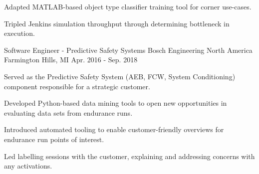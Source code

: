 \begin{cventries}
{\begin{cvitems}
          \item {Adapted MATLAB-based object type classifier training tool for corner use-cases.}
          \item {Tripled Jenkins simulation throughput through determining bottleneck in execution.}
        \fi
      \end{cvitems}
    }

  \cventry
    {Software Engineer - Predictive Safety Systems} %
    {Bosch Engineering North America} %
    {Farmington Hills, MI} %
    {Apr. 2016 - Sep. 2018} %
    {
      \begin{cvitems} %
        \item {Served as the Predictive Safety System (AEB, FCW, System Conditioning) component responsible for a strategic customer.}
        \item {Developed Python-based data mining tools to open new opportunities in evaluating data sets from endurance runs.}
        \item {Introduced automated tooling to enable customer-friendly overviews for endurance run points of interest.}
        \item {Led labelling sessions with the customer, explaining and addressing concerns with any activations.}
      \end{cvitems}
    }


\end{cventries}

